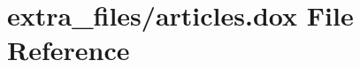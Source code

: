 \hypertarget{articles_8dox}{}\section{extra\+\_\+files/articles.dox File Reference}
\label{articles_8dox}

